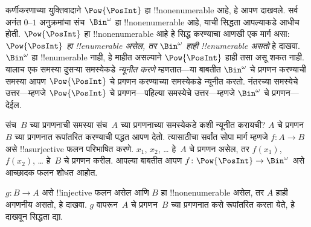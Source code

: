 \documentclass[../../../include/open-logic-section]{subfiles}
\begin{document}









कर्णीकरणाच्या युक्तिवादाने $\Pow{\PosInt}$ हा !!{nonenumerable} आहे,
हे आपण दाखवले. सर्व अनंत $0$--$1$ अनुक्रमांचा संच~$\Bin^\omega$ हा
!!{nonenumerable} आहे, याची सिद्धता आपल्याकडे आधीच होती.
$\Pow{\PosInt}$ हा !!{nonenumerable} आहे हे सिद्ध करण्याचा आणखी एक मार्ग
असा: \emph{$\Pow{\PosInt}$ हा !!{enumerable} असेल, तर $\Bin^\omega$
  हाही !!{enumerable} असतो} हे दाखवा. $\Bin^\omega$ हा !!{enumerable}
नाही, हे माहीत असल्याने $\Pow{\PosInt}$ हाही तसा असू शकत नाही. यालाच
एक समस्या दुसऱ्या समस्येकडे \emph{न्यूनीत करणे} म्हणतात---या बाबतीत
$\Bin^\omega$ चे प्रगणन करण्याची समस्या आपण $\Pow{\PosInt}$ चे प्रगणन
करण्याच्या समस्येकडे न्यूनीत करतो. नंतरच्या समस्येचे उत्तर---म्हणजे
$\Pow{\PosInt}$ चे प्रगणन---पहिल्या समस्येचे उत्तर---म्हणजे
$\Bin^\omega$ चे प्रगणन---देईल.

संच~$B$ च्या प्रगणनाची समस्या संच~$A$ च्या प्रगणनाच्या समस्येकडे कशी
न्यूनीत करायची? $A$ चे प्रगणन $B$ च्या प्रगणनात रूपांतरित करण्याची
पद्धत आपण देतो. त्यासाठीचा सर्वांत सोपा मार्ग म्हणजे
$f\colon A \to B$ असे !!a{surjective} फलन परिभाषित करणे. $x_1$, $x_2$,
\dots{} हे~$A$ चे प्रगणन असेल, तर $f(x_1)$, $f(x_2)$, \dots{} हे~$B$
चे प्रगणन करील. आपल्या बाबतीत आपण
$f\colon \Pow{\PosInt} \to \Bin^\omega$ असे आच्छादक फलन शोधत आहोत.

\begin{prob}
$g\colon B \to A$ असे !!{injective} फलन असेल आणि $B$ हा
!!{nonenumerable} असेल, तर $A$ हाही अगणनीय असतो, हे दाखवा.
$g$ वापरून~$A$ चे प्रगणन~$B$ च्या प्रगणनात कसे रूपांतरित करता येते,
हे दाखवून सिद्धता द्या.
\end{prob}
\end{document}
